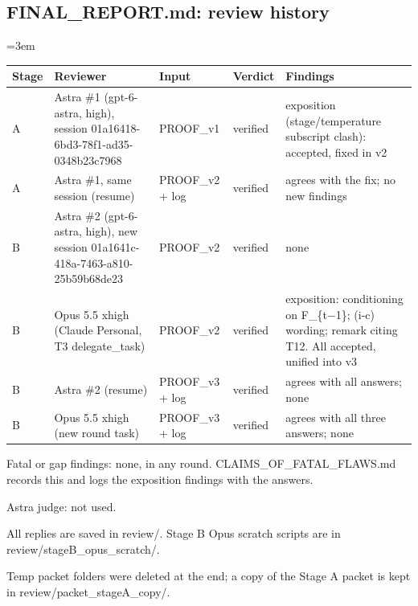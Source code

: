 \documentclass[11pt]{report}
\newenvironment{mdblock}{\begingroup\mdfont\raggedright\setlength{\parindent}{0pt}\setlength{\parskip}{0.55em}\emergencystretch=3em}{\par\endgroup}
\newcommand{\mdhead}[2]{\par\vspace{0.7em}\noindent{\bfseries\ifcase#1\or\large\or\normalsize\or\normalsize\or\small\or\small\or\small\fi #2}\par\nopagebreak\vspace{0.1em}}
\newcommand{\mdsubsec}[1]{\phantomsection\subsection*{#1}}
\begin{document}
\mdsubsec{FINAL\_REPORT.md: review history}
\begin{mdblock}
\mdhead{2}{4. Review history}

{\small
\begin{longtable}{|>{\raggedright\arraybackslash}p{}|>{\raggedright\arraybackslash}p{}|>{\raggedright\arraybackslash}p{}|>{\raggedright\arraybackslash}p{}|>{\raggedright\arraybackslash}p{}|}
\hline
\textbf{Stage} & \textbf{Reviewer} & \textbf{Input} & \textbf{Verdict} & \textbf{Findings} \\ \hline\endhead
A & Astra \#1 (gpt-6-astra, high), session 01a16418-6bd3-78f1-ad35-0348b23c7968 & PROOF\_v1 & verified & 1 exposition (stage/temperature subscript clash): accepted, fixed in v2 \\ \hline
A & Astra \#1, same session (resume) & PROOF\_v2 + log & verified & agrees with the fix; no new findings \\ \hline
B & Astra \#2 (gpt-6-astra, high), new session 01a1641c-418a-7463-a810-25b59b68de23 & PROOF\_v2 & verified & none \\ \hline
B & Opus 5.5 xhigh (Claude Personal, T3 delegate\_task) & PROOF\_v2 & verified & 3 exposition: conditioning on F\_\{t−1\}; (i-c) wording; remark citing T12. All accepted, unified into v3 \\ \hline
B & Astra \#2 (resume) & PROOF\_v3 + log & verified & agrees with all answers; none \\ \hline
B & Opus 5.5 xhigh (new round task) & PROOF\_v3 + log & verified & agrees with all three answers; none \\ \hline
\end{longtable}}

\begin{mdbul}
\item Fatal or gap findings: none, in any round. CLAIMS\_OF\_FATAL\_FLAWS.md records this and logs the exposition findings with the answers.
\item Astra judge: not used.
\item All replies are saved in {\mdtt review/\allowbreak{}}. Stage B Opus scratch scripts are in {\mdtt review/\allowbreak{}stageB\_\allowbreak{}opus\_\allowbreak{}scratch/\allowbreak{}}.
\item Temp packet folders were deleted at the end; a copy of the Stage A packet is kept in {\mdtt review/\allowbreak{}packet\_\allowbreak{}stageA\_\allowbreak{}copy/\allowbreak{}}.
\end{mdbul}
\end{mdblock}
\end{document}
